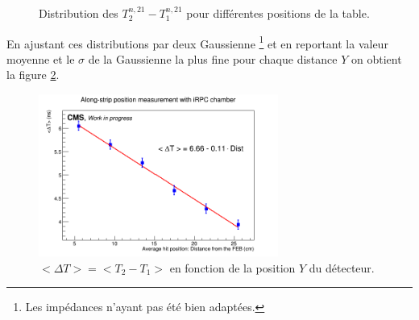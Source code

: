 \begin{figure}[ht!]
	\hfill
	\caption{Distribution des $T^{n,21}_2-T^{n,21}_1$ pour différentes positions de la table.}
	\label{move}
\end{figure}

En ajustant ces distributions par deux Gaussienne \footnote{Les impédances n'ayant pas été bien adaptées.} et en reportant la valeur moyenne et le $\sigma$ de la Gaussienne la plus fine pour chaque distance $Y$ on obtient la figure \ref{Fit}.

\begin{figure}[!ht]
	\centering
	\includegraphics[width=0.7\textwidth]{ELE/MeanT_Pos.jpg}
	\caption{$<\Delta T>=<T_2-T_1>$ en fonction de la position $Y$ du détecteur.}
	\label{Fit}
\end{figure}

